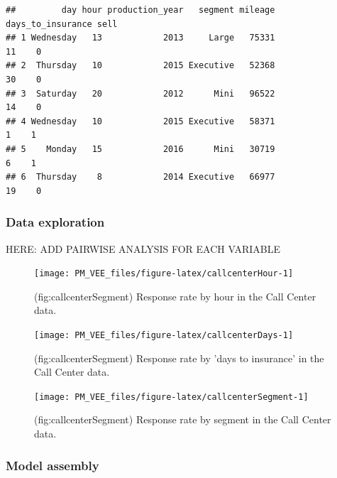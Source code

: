 \documentclass[12pt,]{krantz}
\begin{document}
\begin{verbatim}
##         day hour production_year   segment mileage days_to_insurance sell
## 1 Wednesday   13            2013     Large   75331                11    0
## 2  Thursday   10            2015 Executive   52368                30    0
## 3  Saturday   20            2012      Mini   96522                14    0
## 4 Wednesday   10            2015 Executive   58371                 1    1
## 5    Monday   15            2016      Mini   30719                 6    1
## 6  Thursday    8            2014 Executive   66977                19    0
\end{verbatim}

\hypertarget{data-exploration-1}{%
\subsubsection{Data exploration}\label{data-exploration-1}}

HERE: ADD PAIRWISE ANALYSIS FOR EACH VARIABLE

\begin{figure}

{\centering \texttt{[image: PM\_VEE\_files/figure-latex/callcenterHour-1]} 

}

\caption{(fig:callcenterSegment) Response rate by hour in the Call Center data.}\label{fig:callcenterHour}
\end{figure}

\begin{figure}

{\centering \texttt{[image: PM\_VEE\_files/figure-latex/callcenterDays-1]} 

}

\caption{(fig:callcenterSegment) Response rate by 'days to insurance' in the Call Center data.}\label{fig:callcenterDays}
\end{figure}

\begin{figure}

{\centering \texttt{[image: PM\_VEE\_files/figure-latex/callcenterSegment-1]} 

}

\caption{(fig:callcenterSegment) Response rate by segment in the Call Center data.}\label{fig:callcenterSegment}
\end{figure}

\hypertarget{model-assembly-2}{%
\subsubsection{Model assembly}\label{model-assembly-2}}
\end{document}
